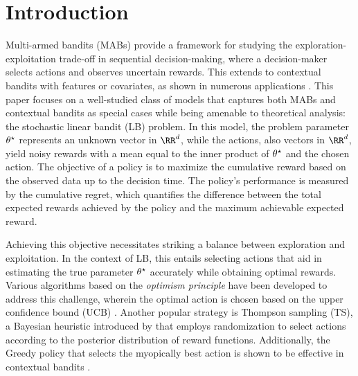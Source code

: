 



\section{Introduction}


Multi-armed bandits (MABs) provide a framework for studying the exploration-exploitation trade-off in sequential decision-making, where a decision-maker selects actions and observes uncertain rewards. This extends to contextual bandits with features or covariates, as shown in numerous applications \citep{langford2008theepoch,li2010contextual,tewari2017ads,zhou2020survey,villar2015multi,bastani2020online,cohen2020feature}. This paper focuses on a well-studied class of models that captures both MABs and contextual bandits as special cases while being amenable to theoretical analysis: the stochastic linear bandit (LB) problem. In this model, the problem parameter $\theta^\star$ represents an unknown vector in $\RR^d$, while the actions, also vectors in $\RR^d$, yield noisy rewards with a mean equal to the inner product of $\theta^\star$ and the chosen action. The objective of a policy is to maximize the cumulative reward based on the observed data up to the decision time. The policy's performance is measured by the cumulative regret, which quantifies the difference between the total expected rewards achieved by the policy and the maximum achievable expected reward. 

Achieving this objective necessitates striking a balance between exploration and exploitation. In the context of LB, this entails selecting actions that aid in estimating the true parameter $\theta^\star$ accurately while obtaining optimal rewards. Various algorithms based on the \emph{optimism principle} have been developed to address this challenge, wherein the optimal action is chosen based on the upper confidence bound (UCB) \citep{lai1985asymptotically, auer2002using, dani2008stochastic, rusmevichientong2010linearly}. Another popular strategy is Thompson sampling (TS), a Bayesian heuristic introduced by \cite{thompson1933likelihood} that employs randomization to select actions according to the posterior distribution of reward functions. Additionally, the Greedy policy that selects the myopically best action is shown to be effective in contextual bandits \citep{kannan2018smoothed,raghavan2018externalities,hao2020adaptive, bastani2021mostly}.

